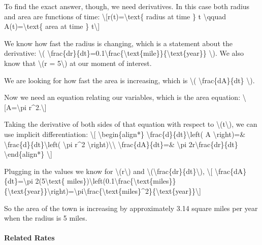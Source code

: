 To find the exact answer, though, we need derivatives. In this case both
radius and area are functions of time:
\textbackslash{}{[}r(t)=\textbackslash{}text\{ radius at time \} t
\textbackslash{}qquad A(t)=\textbackslash{}text\{ area at time \}
t\textbackslash{}{]}

We know how fast the radius is changing, which is a statement about the
derivative: \textbackslash{}(
\textbackslash{}frac\{dr\}\{dt\}=0.1\textbackslash{}frac\{\textbackslash{}text\{mile\}\}\{\textbackslash{}text\{year\}\}
\textbackslash{}). We also know that \textbackslash{}(r =
5\textbackslash{}) at our moment of interest.

We are looking for how fast the area is increasing, which is
\textbackslash{}( \textbackslash{}frac\{dA\}\{dt\} \textbackslash{}).

Now we need an equation relating our variables, which is the area
equation: \textbackslash{}{[}A=\textbackslash{}pi
r\^{}2.\textbackslash{}{]}

Taking the derivative of both sides of that equation with respect to
\textbackslash{}(t\textbackslash{}), we can use implicit
differentiation: \textbackslash{}{[} \textbackslash{}begin\{align*\}
\textbackslash{}frac\{d\}\{dt\}\textbackslash{}left( A
\textbackslash{}right)=\&
\textbackslash{}frac\{d\}\{dt\}\textbackslash{}left( \textbackslash{}pi
r\^{}2 \textbackslash{}right)\textbackslash{}\textbackslash{}
\textbackslash{}frac\{dA\}\{dt\}=\& \textbackslash{}pi
2r\textbackslash{}frac\{dr\}\{dt\} \textbackslash{}end\{align*\}
\textbackslash{}{]}

Plugging in the values we know for \textbackslash{}(r\textbackslash{})
and \textbackslash{}(\textbackslash{}frac\{dr\}\{dt\}\textbackslash{}),
\textbackslash{}{[} \textbackslash{}frac\{dA\}\{dt\}=\textbackslash{}pi
2(5\textbackslash{}text\{
miles\})\textbackslash{}left(0.1\textbackslash{}frac\{\textbackslash{}text\{miles\}\}\{\textbackslash{}text\{year\}\}\textbackslash{}right)=\textbackslash{}pi\textbackslash{}frac\{\textbackslash{}text\{miles\}\^{}2\}\{\textbackslash{}text\{year\}\}\textbackslash{}{]}

So the area of the town is increasing by approximately 3.14 square miles
per year when the radius is 5 miles.

\hypertarget{related-rates-1}{%
\paragraph{Related Rates}\label{related-rates-1}}

